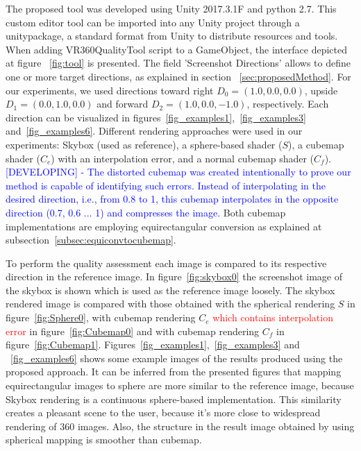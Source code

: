 \documentclass[10pt,conference]{IEEEtran}
\begin{document}
The proposed tool was developed using Unity 2017.3.1F and python 2.7. This custom editor tool can be imported into any Unity project through a unitypackage, a standard format from Unity to distribute resources and tools. When adding VR360QualityTool script to a GameObject, the interface depicted at figure ~\ref{fig:tool} is presented. The field 'Screenshot Directions' allows to define one or more target directions, as explained in section ~\ref{sec:proposedMethod}. For our experiments, we used directions toward right $D_0 = (1.0, 0.0, 0.0)$, upside $D_1 = (0.0, 1.0, 0.0)$ and forward $D_2 = (1.0, 0.0, -1.0)$, respectively. Each direction can be visualized in figures~\ref{fig_examples1},~\ref{fig_examples3} and~\ref{fig_examples6}. Different rendering approaches were used in our experiments: Skybox (used as reference), a sphere-based shader ($S$), a cubemap shader ($C_e$) with an interpolation error, and a normal cubemap shader ($C_f$). \textcolor{blue}{[DEVELOPING] - The distorted cubemap was created intentionally to prove our method is capable of identifying such errors. Instead of interpolating in the desired direction, i.e., from 0.8 to 1, this cubemap interpolates in the opposite direction (0.7, 0.6 ... 1) and compresses the image}. Both cubemap implementations are employing equirectangular conversion as explained at subsection~\ref{subsec:equiconvtocubemap}.


To perform the quality assessment each image is compared to its respective direction in the reference image. In figure~\ref{fig:skybox0} the screenshot image of the skybox is shown which is used as the reference image loosely. The skybox rendered image is compared with those obtained with the spherical rendering $S$ in figure~\ref{fig:Sphere0}, with cubemap rendering $C_e$ \textcolor{red}{which contains interpolation error} in figure~\ref{fig:Cubemap0} and with cubemap rendering $C_f$ in figure~\ref{fig:Cubemap1}.  Figures~\ref{fig_examples1},~\ref{fig_examples3} and ~\ref{fig_examples6} shows some example images of the results produced using the proposed approach. It can be inferred from the presented figures that mapping equirectangular images to sphere are more similar to the reference image, because Skybox rendering is a continuous sphere-based implementation. This similarity creates a pleasant scene to the user, because it's more close to widespread rendering of 360 images. Also, the structure in the result image obtained by using spherical mapping is smoother than cubemap. \par
\end{document}

